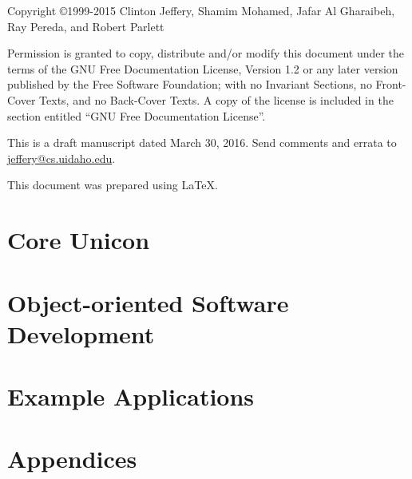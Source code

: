 \documentclass[letterpaper,twoside,12pt]{book}
\begin{document}
\thispagestyle{empty}
\bigskip
\bigskip
Copyright \copyright 1999-2015 Clinton Jeffery, Shamim Mohamed,
Jafar Al Gharaibeh, Ray Pereda, and Robert Parlett

Permission is granted to copy, distribute and/or modify this document under the
terms of the GNU Free Documentation License, Version 1.2 or any later version
published by the Free Software Foundation; with no Invariant Sections, no
Front-Cover Texts, and no Back-Cover Texts. A copy of the license is included in
the section entitled ``GNU Free Documentation License''.
\bigskip


This is a draft manuscript dated March 30, 2016.  Send comments and errata
to \linebreak \href{mailto:jeffery@cs.uidaho.edu}{jeffery@cs.uidaho.edu}.

\bigskip
This document was prepared using \LaTeX.
\clearpage

\frontmatter
\setcounter{tocdepth}{2}
\tableofcontents


\mainmatter



\part{Core Unicon}











\part{Object-oriented Software Development}







\part{Example Applications}








\part{Appendices}
\appendix







% 

\backmatter


\small
\printindex
\end{document}
